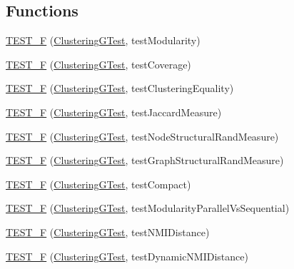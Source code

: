 \subsection*{Functions}
\begin{DoxyCompactItemize}
\item 
\hyperlink{namespace_networ_kit_ae7329d30d6284a0d4aee6045ad5fa91a}{T\-E\-S\-T\-\_\-\-F} (\hyperlink{class_networ_kit_1_1_clustering_g_test}{Clustering\-G\-Test}, test\-Modularity)
\item 
\hyperlink{namespace_networ_kit_a71dcdd3a5c7565c91853184aa9f55f42}{T\-E\-S\-T\-\_\-\-F} (\hyperlink{class_networ_kit_1_1_clustering_g_test}{Clustering\-G\-Test}, test\-Coverage)
\item 
\hyperlink{namespace_networ_kit_afe44bdb419de446e1d0b18cc54dd356a}{T\-E\-S\-T\-\_\-\-F} (\hyperlink{class_networ_kit_1_1_clustering_g_test}{Clustering\-G\-Test}, test\-Clustering\-Equality)
\item 
\hyperlink{namespace_networ_kit_a0a7b4a1fa32e5f373fd606be55d76f54}{T\-E\-S\-T\-\_\-\-F} (\hyperlink{class_networ_kit_1_1_clustering_g_test}{Clustering\-G\-Test}, test\-Jaccard\-Measure)
\item 
\hyperlink{namespace_networ_kit_acd478cadbd564e627c9b5be11de9cca7}{T\-E\-S\-T\-\_\-\-F} (\hyperlink{class_networ_kit_1_1_clustering_g_test}{Clustering\-G\-Test}, test\-Node\-Structural\-Rand\-Measure)
\item 
\hyperlink{namespace_networ_kit_ad57325d3837c89e3e00986eb97ac755e}{T\-E\-S\-T\-\_\-\-F} (\hyperlink{class_networ_kit_1_1_clustering_g_test}{Clustering\-G\-Test}, test\-Graph\-Structural\-Rand\-Measure)
\item 
\hyperlink{namespace_networ_kit_a5ac06aed48bc1e0ccca80504a00bf25d}{T\-E\-S\-T\-\_\-\-F} (\hyperlink{class_networ_kit_1_1_clustering_g_test}{Clustering\-G\-Test}, test\-Compact)
\item 
\hyperlink{namespace_networ_kit_a0355e2081537a2ab8a0cb849ed547478}{T\-E\-S\-T\-\_\-\-F} (\hyperlink{class_networ_kit_1_1_clustering_g_test}{Clustering\-G\-Test}, test\-Modularity\-Parallel\-Vs\-Sequential)
\item 
\hyperlink{namespace_networ_kit_abd7bdae0f91d885eae6008a4e448f002}{T\-E\-S\-T\-\_\-\-F} (\hyperlink{class_networ_kit_1_1_clustering_g_test}{Clustering\-G\-Test}, test\-N\-M\-I\-Distance)
\item 
\hyperlink{namespace_networ_kit_abd2632194aaba16d2e394654a5be056d}{T\-E\-S\-T\-\_\-\-F} (\hyperlink{class_networ_kit_1_1_clustering_g_test}{Clustering\-G\-Test}, test\-Dynamic\-N\-M\-I\-Distance)

\end{DoxyCompactItemize}
